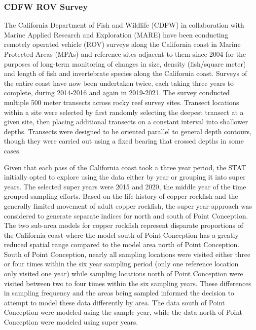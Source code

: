 \documentclass[11pt,
  letterpaper,
]{article}
\begin{document}
\subsubsection{CDFW ROV Survey}\label{cdfw-rov-not-included}

The California Department of Fish and Wildlife (CDFW) in collaboration with Marine Applied Research and Exploration (MARE) have been conducting remotely operated vehicle (ROV) surveys along the California coast in Marine Protected Areas (MPAs) and reference sites adjacent to them since 2004 for the purposes of long-term monitoring of changes in size, density (fish/square meter) and length of fish and invertebrate species along the California coast. Surveys of the entire coast have now been undertaken twice, each taking three years to complete, during 2014-2016 and again in 2019-2021. The survey conducted multiple 500 meter transects across rocky reef survey sites. Transect locations within a site were selected by first randomly selecting the deepest transect at a given site, then placing additional transects on a constant interval into shallower depths. Transects were designed to be oriented parallel to general depth contours, though they were carried out using a fixed bearing that crossed depths in some cases.

Given that each pass of the California coast took a three year period, the STAT initially opted to explore using the data either by year or grouping it into super years. The selected super years were 2015 and 2020, the middle year of the time grouped sampling efforts. Based on the life history of copper rockfish and the generally limited movement of adult copper rockfish, the super year approach was considered to generate separate indices for north and south of Point Conception. The two sub-area models for copper rockfish represent disparate proportions of the California coast where the model south of Point Conception has a greatly reduced spatial range compared to the model area north of Point Conception. South of Point Conception, nearly all sampling locations were visited either three or four times within the six year sampling period (only one reference location only visited one year) while sampling locations north of Point Conception were visited between two to four times within the six sampling years. These differences in sampling frequency and the areas being sampled informed the decision to attempt to model these data differently by area. The data south of Point Conception were modeled using the sample year, while the data north of Point Conception were modeled using super years.
\end{document}
